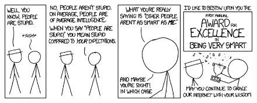 \documentclass[11pt,landscape]{article}
\begin{document}
\begin{figure}[H]
\centering
    \includegraphics[scale=0.75]{./Images/2/people_are_stupidxkcd.png}
\end{figure}
\end{document}
